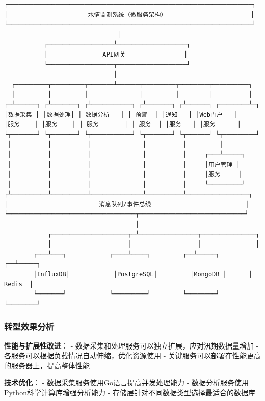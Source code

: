 \begin{lstlisting}
┌───────────────────────────────────────────────────────────────────┐
│                      水情监测系统（微服务架构）                       │
└───────────────────────────────────────────────────────────────────┘
                               │
           ┌──────────────────┴───────────────────┐
           │               API网关                │
           └──────────────────┬───────────────────┘
                              │
  ┌─────────┬─────────┬───────┴──────┬─────────┬────────┬──────────┐
  │         │         │              │         │        │          │
┌─┴──────┐ ┌┴───────┐ ┌┴───────────┐ ┌┴───────┐ ┌┴──────┐ ┌────────┴─┐
│数据采集 │ │数据处理│ │ 数据分析   │ │ 预警  │ │通知   │ │Web门户   │
│服务    │ │服务    │ │ 服务       │ │ 服务  │ │服务   │ │服务      │
└┬───────┘ └┬───────┘ └┬───────────┘ └┬───────┘ └┬──────┘ └┬─────────┘
 │          │          │              │          │         │
 │          │          │              │          │     ┌───┴─────┐
 │          │          │              │          │     │用户管理 │
 │          │          │              │          │     │服务     │
 │          │          │              │          │     └─────────┘
┌┴──────────┴──────────┴──────────────┴──────────┴─────────────────┐
│                         消息队列/事件总线                          │
└───────────────────────────────────┬─────────────────────────────┘
                                    │
            ┌─────────────────────┬─┴────────────────┬───────────────┐
            │                     │                  │               │
        ┌───┴───┐            ┌────┴────┐         ┌──┴─────┐      ┌──┴─────┐
        │InfluxDB│            │PostgreSQL│         │MongoDB │      │ Redis  │
        └───────┘            └─────────┘         └────────┘      └────────┘
\end{lstlisting}

\subsubsection{转型效果分析}\label{ux8f6cux578bux6548ux679cux5206ux6790}

\textbf{性能与扩展性改进}： -
数据采集和处理服务可以独立扩展，应对汛期数据量增加 -
各服务可以根据负载情况自动伸缩，优化资源使用 -
关键服务可以部署在性能更高的服务器上，提高整体性能

\textbf{技术优化}： - 数据采集服务使用Go语言提高并发处理能力 -
数据分析服务使用Python科学计算库增强分析能力 -
存储层针对不同数据类型选择最适合的数据库

